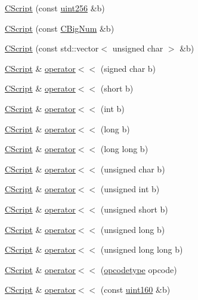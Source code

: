 \begin{DoxyCompactItemize}
\item 
\hyperlink{class_c_script_ac6e18fc38394ffe9106d9a92e89de1f6}{C\+Script} (const \hyperlink{classuint256}{uint256} \&b)
\item 
\hyperlink{class_c_script_a014fc30e86c347e56e0209f162a1ccf5}{C\+Script} (const \hyperlink{class_c_big_num}{C\+Big\+Num} \&b)
\item 
\hyperlink{class_c_script_ab2348dd32f252c468f793ec290924603}{C\+Script} (const std\+::vector$<$ unsigned char $>$ \&b)
\item 
\hyperlink{class_c_script}{C\+Script} \& \hyperlink{class_c_script_abdf14321fc2c312c6511d71a93c3e203}{operator$<$$<$} (signed char b)
\item 
\hyperlink{class_c_script}{C\+Script} \& \hyperlink{class_c_script_adeaf67a2297341084f491391c5e30dbc}{operator$<$$<$} (short b)
\item 
\hyperlink{class_c_script}{C\+Script} \& \hyperlink{class_c_script_a9ee5ba660433d0a94dc878abb6a52cb7}{operator$<$$<$} (int b)
\item 
\hyperlink{class_c_script}{C\+Script} \& \hyperlink{class_c_script_ab7ef0495ce132d037a1e9b4a587cb85d}{operator$<$$<$} (long b)
\item 
\hyperlink{class_c_script}{C\+Script} \& \hyperlink{class_c_script_a0c0586f1299a5616d90ca15a892224e0}{operator$<$$<$} (long long b)
\item 
\hyperlink{class_c_script}{C\+Script} \& \hyperlink{class_c_script_aff101499fddf174a76ebfb26703a623f}{operator$<$$<$} (unsigned char b)
\item 
\hyperlink{class_c_script}{C\+Script} \& \hyperlink{class_c_script_a40ad78fa50bf8c0c123d4d7dd6f312f5}{operator$<$$<$} (unsigned int b)
\item 
\hyperlink{class_c_script}{C\+Script} \& \hyperlink{class_c_script_a53021b06198de8c0e1b90573ab40288a}{operator$<$$<$} (unsigned short b)
\item 
\hyperlink{class_c_script}{C\+Script} \& \hyperlink{class_c_script_a776d16c903e9247168478d4a4a1657ec}{operator$<$$<$} (unsigned long b)
\item 
\hyperlink{class_c_script}{C\+Script} \& \hyperlink{class_c_script_a025a2179fab8da2ae60ee23652dc276e}{operator$<$$<$} (unsigned long long b)
\item 
\hyperlink{class_c_script}{C\+Script} \& \hyperlink{class_c_script_af22201e1171b6390b4a06678d00c78d3}{operator$<$$<$} (\hyperlink{script_8h_a63e349a6089a54da9fe09a3d858648bd}{opcodetype} opcode)
\item 
\hyperlink{class_c_script}{C\+Script} \& \hyperlink{class_c_script_a9f0b6c18779332fab3e59f862ed95dea}{operator$<$$<$} (const \hyperlink{classuint160}{uint160} \&b)

\end{DoxyCompactItemize}

